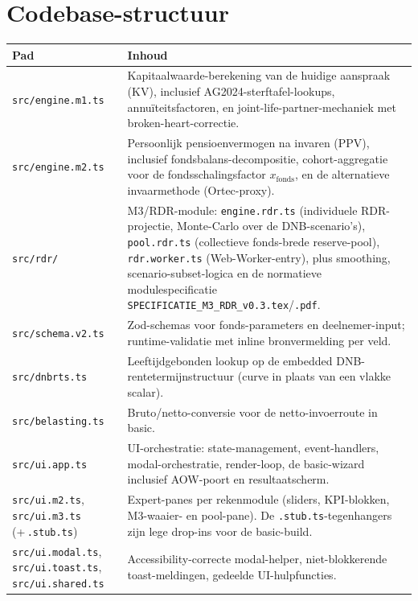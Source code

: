 \documentclass[11pt,a4paper]{article}
\newcommand{\code}[1]{\texttt{#1}}
\begin{document}
\section{Codebase-structuur}
\label{sec:codebase}

\begin{longtable}{@{}>{\raggedright\arraybackslash}p{}>{\raggedright\arraybackslash}p{}@{}}
\toprule
\textbf{Pad} & \textbf{Inhoud} \\
\midrule
\endhead
\code{src/engine.m1.ts} & Kapitaalwaarde-berekening van de huidige aanspraak (KV), inclusief AG2024-sterftafel-lookups, annu\"iteitsfactoren, en joint-life-partner-mechaniek met broken-heart-correctie. \\
\code{src/engine.m2.ts} & Persoonlijk pensioenvermogen na invaren (PPV), inclusief fondsbalans-decompositie, cohort-aggregatie voor de fondsschalingsfactor $x_{\text{fonds}}$, en de alternatieve invaarmethode (Ortec-proxy). \\
\code{src/rdr/} & M3/RDR-module: \code{engine.rdr.ts} (individuele RDR-projectie, Monte-Carlo over de DNB-scenario's), \code{pool.rdr.ts} (collectieve fonds-brede reserve-pool), \code{rdr.worker.ts} (Web-Worker-entry), plus smoothing, scenario-subset-logica en de normatieve modulespecificatie \code{SPECIFICATIE\_M3\_RDR\_v0.3.tex}/\code{.pdf}. \\
\code{src/schema.v2.ts} & Zod-schemas voor fonds-parameters en deelnemer-input; runtime-validatie met inline bronvermelding per veld. \\
\code{src/dnbrts.ts} & Leeftijdgebonden lookup op de embedded DNB-rentetermijnstructuur (curve in plaats van een vlakke scalar). \\
\code{src/belasting.ts} & Bruto/netto-conversie voor de netto-invoerroute in basic. \\
\code{src/ui.app.ts} & UI-orchestratie: state-management, event-handlers, modal-orchestratie, render-loop, de basic-wizard inclusief AOW-poort en resultaatscherm. \\
\code{src/ui.m2.ts}, \code{src/ui.m3.ts} (+\,\code{.stub.ts}) & Expert-panes per rekenmodule (sliders, KPI-blokken, M3-waaier- en pool-pane). De \code{.stub.ts}-tegenhangers zijn lege drop-ins voor de basic-build. \\
\code{src/ui.modal.ts}, \code{src/ui.toast.ts}, \code{src/ui.shared.ts} & Accessibility-correcte modal-helper, niet-blokkerende toast-meldingen, gedeelde UI-hulpfuncties. \\

\end{longtable}
\end{document}

